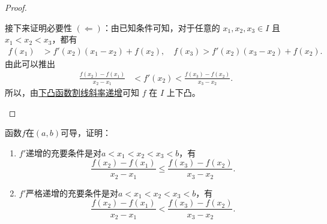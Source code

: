 \documentclass[../../main.tex]{subfiles}%
\begin{document}
\begin{proof}
\begin{enumerate}
\begin{enumerate}[(1)]
接下来证明必要性 $(\Leftarrow)$：由已知条件可知，对于任意的 $x_1,x_2,x_3\in I$ 且 $x_1 < x_2 < x_3$，都有
\begin{align*}
f(x_1) &> f'(x_2)(x_1 - x_2) + f(x_2),\quad f(x_3) > f'(x_2)(x_3 - x_2) + f(x_2).
\end{align*}
由此可以推出
\begin{align*}
\frac{f(x_2) - f(x_1)}{x_2 - x_1} &< f'(x_2) < \frac{f(x_3) - f(x_2)}{x_3 - x_2}.
\end{align*}
所以，由\hyperref[下凸函数割线斜率递增]{下凸函数割线斜率递增}可知 $f$ 在 $I$ 上下凸。
\end{enumerate}
\end{enumerate}
\end{proof}

\begin{proposition}[$\,\,$导数递增则割线斜率也递增]\label{example:导数递增则割线斜率也递增}
函数\(f\)在\((a,b)\)可导，证明：
\begin{enumerate}
\item \(f'\)递增的充要条件是对\(a < x_1 < x_2 < x_3 < b\)，有
\[
\frac{f(x_2)-f(x_1)}{x_2 - x_1}\leqslant\frac{f(x_3)-f(x_2)}{x_3 - x_2}.
\]

\item \(f'\)严格递增的充要条件是对\(a < x_1 < x_2 < x_3 < b\)，有
\[
\frac{f(x_2)-f(x_1)}{x_2 - x_1}<\frac{f(x_3)-f(x_2)}{x_3 - x_2}.
\]
\end{enumerate}
\end{proposition}
\end{document}

